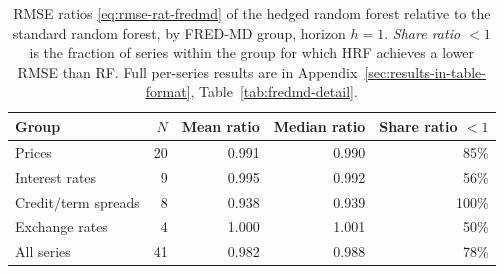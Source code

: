 \begin{table}[ht]
\centering
\begin{tabular}{lrrrr}
\toprule
\textbf{Group} & \textbf{$N$} & \textbf{Mean ratio} & \textbf{Median ratio} & \textbf{Share ratio $<1$} \\
\midrule
Prices & 20 & 0.991 & 0.990 & 85\% \\
Interest rates & 9 & 0.995 & 0.992 & 56\% \\
Credit/term spreads & 8 & 0.938 & 0.939 & 100\% \\
Exchange rates & 4 & 1.000 & 1.001 & 50\% \\
\midrule
All series & 41 & 0.982 & 0.988 & 78\% \\
\bottomrule
\end{tabular}
\caption{RMSE ratios \eqref{eq:rmse-rat-fredmd} of the hedged random forest relative to the standard random forest, by FRED-MD group, horizon $h=1$. \emph{Share ratio $<1$} is the fraction of series within the group for which HRF achieves a lower RMSE than RF. Full per-series results are in Appendix~\ref{sec:results-in-table-format}, Table~\ref{tab:fredmd-detail}.}
\label{table:fredmd-summary}
\end{table}
